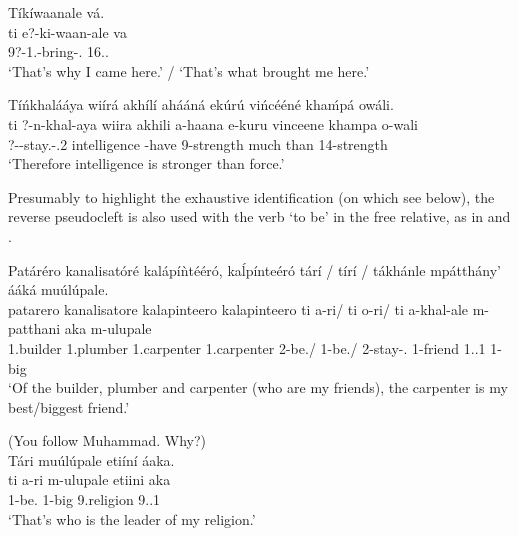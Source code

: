\documentclass[output=paper]{langscibook}
\begin{document}
\ea
\label{bkm:Ref129270545}
Tíkíwaanale vá.\\
\gll
ti  e?-ki-waan-ale  va\\
\COP{}  9?{}-1\SG{}.\OM{}-bring-\PFV{}.\REL{}  16.\DEM{}.\PROX{}\\
\glt
‘That’s why I came here.’ / ‘That’s what brought me here.’\\


\z

\ea
\label{bkm:Ref97026059}
Tíńkhalááya wiírá akhílí ahááná ekúrú vińcééné khaḿpá owáli.\\
\gll
ti  ?-n-khal-aya  wiira  akhili  a-haana  e-kuru  vinceene   khampa  o-wali\\
\COP{}  ?-\PRS{}-stay.\REL{}-\POSS{}.2  \COMP{}  intelligence  \SM{}-have  9-strength  much    than  14-strength\\
\glt
‘Therefore intelligence is stronger than force.’

\z


Presumably to highlight the exhaustive identification (on which see below), the reverse pseudocleft is also used with the verb ‘to be’ in the free relative, as in  and .

\ea
\label{bkm:Ref110415187}
Patáréro kanalisatóré kalápíǹtééró, kaĺpínteéró tárí / tírí / tákhánle mpátthány’ ááká muúlúpale.\\
\gll
patarero  kanalisatore  kalapinteero  kalapinteero ti  a-ri/  ti  o{}-ri/  ti  a-khal-ale  m-patthani  aka  m-ulupale\\
1.builder  1.plumber  1.carpenter  1.carpenter  \COP{}  2{}-be.\REL{}/  \COP{}  1-be.\REL{}/  \COP{}  2-stay-\PFV{}.\REL{}  1-friend  1.\POSS{}.1\SG{}  1-big\\
\glt ‘Of the builder, plumber and carpenter (who are my friends), the carpenter is my best/biggest friend.’

\z

\ea
\label{bkm:Ref110415189}
(You follow Muhammad. Why?)\\
Tári muúlúpale etiíní áaka.\\
\gll
ti  a-ri  m-ulupale  etiini   aka\\
\COP{}  1-be.\REL{}  1-big  9.religion  9.\POSS{}.1\SG{}\\
\glt
‘That’s who is the leader of my religion.’\\
\end{document}
